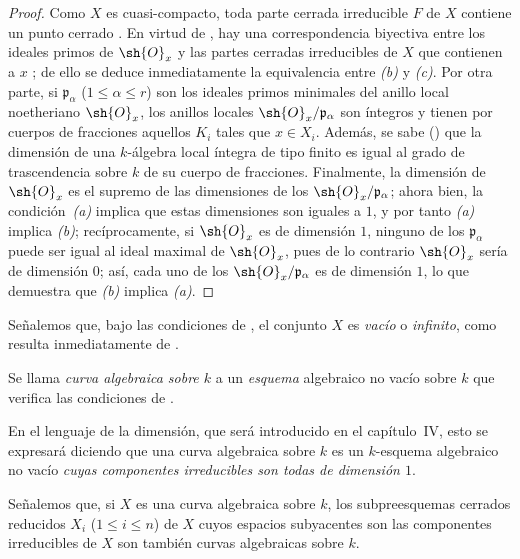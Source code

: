 \documentclass[oneside,10pt]{amsart}
\renewcommand{\leq}{\leqslant}
\let\EGAOriginalLabel\label
\renewcommand{\label}[1]{\phantomsection\EGAOriginalLabel{#1}}
\begin{document}
\begin{proof}
Como $X$ es cuasi-compacto, toda parte cerrada irreducible $F$ de $X$ contiene un punto cerrado .
En virtud de , hay una correspondencia biyectiva entre los ideales primos de $\sh{O}_x$ y las partes cerradas irreducibles de $X$ que contienen a $x$ ;
de ello se deduce inmediatamente la equivalencia entre \emph{(b)} y \emph{(c)}.
Por otra parte, si $\mathfrak{p}_\alpha$ ($1\leq\alpha\leq r$) son los ideales primos minimales del anillo local noetheriano $\sh{O}_x$, los anillos locales $\sh{O}_x/\mathfrak{p}_\alpha$ son íntegros y tienen por cuerpos de fracciones aquellos $K_i$ tales que $x\in X_i$.
Además, se sabe (\cite[p.~4-06, th.~2]{I-1}) que la dimensión de una $k$-álgebra local íntegra de tipo finito es igual al grado de trascendencia sobre $k$ de su cuerpo de fracciones.
Finalmente, la dimensión de $\sh{O}_x$ es el supremo de las dimensiones de los $\sh{O}_x/\mathfrak{p}_\alpha$;
ahora bien, la condición~\emph{(a)} implica que estas dimensiones son iguales a $1$, y por tanto \emph{(a)} implica \emph{(b)};
recíprocamente, si $\sh{O}_x$ es de dimensión $1$, ninguno de los $\mathfrak{p}_\alpha$ puede ser igual al ideal maximal de $\sh{O}_x$, pues de lo contrario $\sh{O}_x$ sería de dimensión $0$;
así, cada uno de los $\sh{O}_x/\mathfrak{p}_\alpha$ es de dimensión $1$, lo que demuestra que \emph{(b)} implica \emph{(a)}.
\end{proof}

Señalemos que, bajo las condiciones de , el conjunto $X$ es \emph{vacío} o \emph{infinito}, como resulta inmediatamente de .

\begin{definition}[7.4.2]
\label{II.7.4.2}
Se llama \emph{curva algebraica sobre $k$} a un \emph{esquema} algebraico no vacío sobre $k$ que verifica las condiciones de .
\end{definition}

En el lenguaje de la dimensión, que será introducido en el capítulo~IV, esto se expresará diciendo que una curva algebraica sobre $k$ es un $k$-esquema algebraico no vacío \emph{cuyas componentes irreducibles son todas de dimensión $1$}.

Señalemos que, si $X$ es una curva algebraica sobre $k$, los subpreesquemas cerrados reducidos $X_i$ ($1\leq i\leq n$) de $X$ cuyos espacios subyacentes son las componentes irreducibles de $X$ son también curvas algebraicas sobre $k$.
\end{document}
